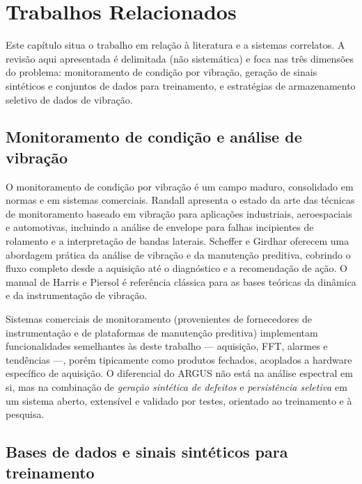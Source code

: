 \chapter{Trabalhos Relacionados}
\label{cap:trabalhos}

Este capítulo situa o trabalho em relação à literatura e a sistemas correlatos.
A revisão aqui apresentada é delimitada (não sistemática) e foca nas três
dimensões do problema: monitoramento de condição por vibração, geração de
sinais sintéticos e conjuntos de dados para treinamento, e estratégias de
armazenamento seletivo de dados de vibração.

\section{Monitoramento de condição e análise de vibração}

O monitoramento de condição por vibração é um campo maduro, consolidado em
normas e em sistemas comerciais. Randall \cite{randall2011} apresenta o estado
da arte das técnicas de monitoramento baseado em vibração para aplicações
industriais, aeroespaciais e automotivas, incluindo a análise de envelope para
falhas incipientes de rolamento e a interpretação de bandas laterais. Scheffer
e Girdhar \cite{scheffer2004} oferecem uma abordagem prática da análise de
vibração e da manutenção preditiva, cobrindo o fluxo completo desde a
aquisição até o diagnóstico e a recomendação de ação. O manual de Harris e
Piersol \cite{harris2002} é referência clássica para as bases teóricas da
dinâmica e da instrumentação de vibração.

Sistemas comerciais de monitoramento (provenientes de fornecedores de
instrumentação e de plataformas de manutenção preditiva) implementam
funcionalidades semelhantes às deste trabalho --- aquisição, FFT, alarmes e
tendências ---, porém tipicamente como produtos fechados, acoplados a hardware
específico de aquisição. O diferencial do ARGUS não está na análise espectral em
si, mas na combinação de \emph{geração sintética de defeitos} e
\emph{persistência seletiva} em um sistema aberto, extensível e validado por
testes, orientado ao treinamento e à pesquisa.

\section{Bases de dados e sinais sintéticos para treinamento}


